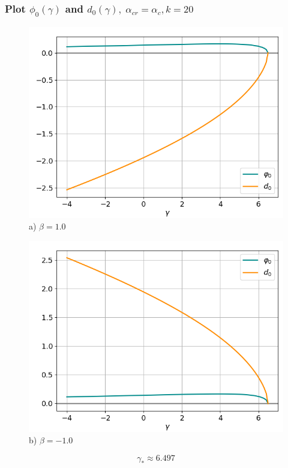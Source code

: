 \documentclass[fullscreen=true, unicode, bookmarks=false]{beamer}
\begin{document}
\begin{frame}
\frametitle{ Plot $ \phi_0(\gamma) $ and $ d_0(\gamma), \; \alpha_{cr} = \alpha_c, k = 20 $ }

\begin{figure} 
\begin{minipage}[h]{0.49\linewidth}
\begin{center}
\includegraphics[scale=0.37]{oscillating_phi0d0_x0_039_beta_10.png} \\ {\scriptsize a) $ \beta = 1.0 $}
\end{center}
\end{minipage} 
\hfill
\begin{minipage}[h]{0.49\linewidth}
\begin{center}
\includegraphics[scale=0.37]{oscillating_phi0d0_x0_039_beta_-10.png}  \\ {\scriptsize b) $ \beta = -1.0 $}
\end{center}
\end{minipage} 
\end{figure}
$$ \gamma_* \approx 6.497 $$

\end{frame}
\end{document}

